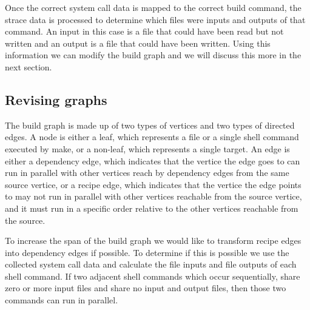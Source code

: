 \documentclass[twocolumn,sigplan,10pt,review]{acmart}
\begin{document}
Once the correct system call data is mapped to the correct build command, the strace data is
processed to determine which files were inputs and outputs of that command.  An input in this case
is a file that could have been read but not written and an output is a file that could have been
written.  Using this information we can modify the build graph and we will discuss this more
in the next section.




\subsection{Revising graphs}
\label{sec:revisegraphs}

The build graph is made up of two types of vertices and two types of directed edges.  A node is
either a leaf, which represents a file or a single shell command executed by make, or a non-leaf,
which represents a single target.  An edge is either a dependency edge, which indicates that the
vertice the edge goes to can run in parallel with other vertices reach by dependency edges from the
same source vertice, or a recipe edge, which indicates that the vertice the edge points to may not
run in parallel with other vertices reachable from the source vertice, and it must run in a
specific order relative to the other vertices reachable from the source.

To increase the span of the build graph we would like to transform recipe edges into dependency
edges if possible.  To determine if this is possible we use the collected system call data and
calculate the file inputs and file outputs of each shell command.  If two adjacent shell commands
which occur sequentially, share zero or more input files and share no input and output files, then
those two commands can run in parallel.
\end{document}
